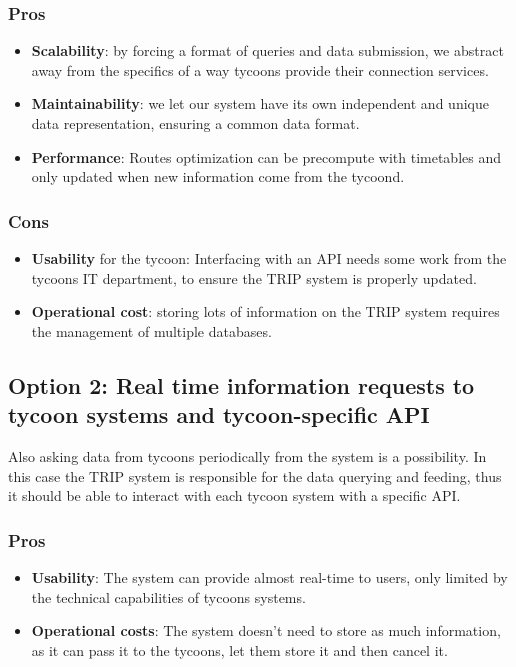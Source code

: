 \subsubsection*{Pros}
\begin{itemize}[noitemsep]
    \item \textbf{Scalability}: by forcing a format of queries and data submission, we abstract away from the specifics of a way tycoons provide their connection services.
    \item \textbf{Maintainability}: we let our system have its own independent and unique data representation, ensuring a common data format.
    \item \textbf{Performance}: Routes optimization can be precompute with timetables and only updated when new information come from the tycoond.
\end{itemize}
\subsubsection*{Cons}
\begin{itemize}[noitemsep]
    \item \textbf{Usability} for the tycoon: Interfacing with an API needs some work from the tycoons IT department, to ensure the TRIP system is properly updated.
    \item \textbf{Operational cost}: storing lots of information on the TRIP system requires the management of multiple databases.
\end{itemize}


\subsection*{Option 2: Real time information requests to tycoon systems and tycoon-specific API}
Also asking data from tycoons periodically from the system is a possibility. In this case the TRIP system is
responsible for the data querying and feeding, thus it should be able to interact with each tycoon system with a specific API.
\subsubsection*{Pros}
\begin{itemize}[noitemsep]
    \item \textbf{Usability}: The system can provide almost real-time to users, only limited by the technical capabilities of tycoons systems.
    \item \textbf{Operational costs}: The system doesn't need to store as much information, as it can pass it to the tycoons, let them store it and then cancel it.
\end{itemize}
